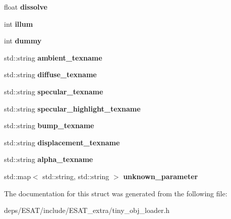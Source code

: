 \begin{DoxyCompactItemize}
float {\bfseries dissolve}
\item 
\mbox{\label{structtinyobj_1_1material__t_af846245315bd70c1a4f815dfdd6b80cc}} 
int {\bfseries illum}
\item 
\mbox{\label{structtinyobj_1_1material__t_a6b1814d1066609178c81d2a4f7b34bd8}} 
int {\bfseries dummy}
\item 
\mbox{\label{structtinyobj_1_1material__t_ae988eed637f368374becbb672798a45e}} 
std\+::string {\bfseries ambient\+\_\+texname}
\item 
\mbox{\label{structtinyobj_1_1material__t_ad7f71a301a261fca07d2e50edccc792d}} 
std\+::string {\bfseries diffuse\+\_\+texname}
\item 
\mbox{\label{structtinyobj_1_1material__t_aed8c38d64472ba0db5186dba800b1b34}} 
std\+::string {\bfseries specular\+\_\+texname}
\item 
\mbox{\label{structtinyobj_1_1material__t_a5c0e981297646f1fc1aeba616692c41b}} 
std\+::string {\bfseries specular\+\_\+highlight\+\_\+texname}
\item 
\mbox{\label{structtinyobj_1_1material__t_aceb73086232f1cdd82f956fe8c6efcfb}} 
std\+::string {\bfseries bump\+\_\+texname}
\item 
\mbox{\label{structtinyobj_1_1material__t_ab69842db3e67cc7d4dcd8bfe02590f92}} 
std\+::string {\bfseries displacement\+\_\+texname}
\item 
\mbox{\label{structtinyobj_1_1material__t_a1b0225fd76de506f089fdedbf2c66dec}} 
std\+::string {\bfseries alpha\+\_\+texname}
\item 
\mbox{\label{structtinyobj_1_1material__t_a18b700227c94d410ed1aa550c7fa9226}} 
std\+::map$<$ std\+::string, std\+::string $>$ {\bfseries unknown\+\_\+parameter}
\end{DoxyCompactItemize}


The documentation for this struct was generated from the following file\+:\begin{DoxyCompactItemize}
\item 
deps/\+E\+S\+A\+T/include/\+E\+S\+A\+T\+\_\+extra/tiny\+\_\+obj\+\_\+loader.\+h\end{DoxyCompactItemize}
